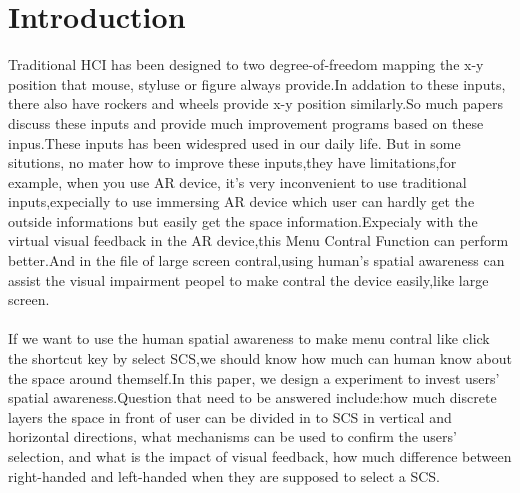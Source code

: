\section{Introduction}
\label{intro}
Traditional HCI has been designed to two degree-of-freedom mapping the x-y position that mouse, styluse or figure always provide.In addation to these inputs, there also have rockers and wheels provide x-y position similarly.So much papers discuss these inputs and provide much improvement programs based on these inpus.These inputs has been widespred used in our daily life.
But in some situtions, no mater how to improve these inputs,they have limitations,for example, when you use AR device, it's very inconvenient to use traditional inputs,expecially to use immersing AR  device which user can hardly get the outside informations but easily get the space information.Expecialy with the virtual visual feedback in the AR device,this Menu Contral Function can perform better.And in the file of large screen contral,using human's spatial awareness can assist the visual impairment peopel to make contral the device easily,like large screen.
\\
\\
If we want to use the human spatial awareness to make menu contral like click the shortcut key by select SCS,we should know how much can human know about the space around themself.In this paper, we design a experiment to invest users' spatial awareness.Question that need to be answered include:how much discrete layers the space in front of user can be divided in to SCS in vertical and horizontal directions, what mechanisms can be used to confirm the users' selection, and what is the impact of visual feedback, how much difference between right-handed and left-handed when they are supposed to select a SCS.
\\
\\
